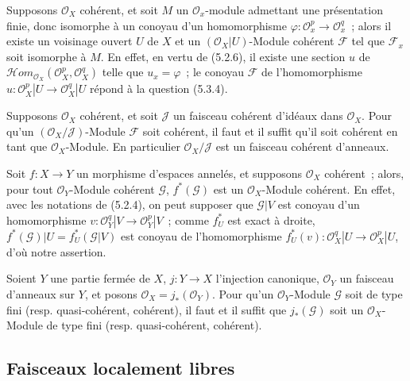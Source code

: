 \begin{env}[5.3.9]
\label{0.5.3.9-fr}
Supposons $\mathcal{O}_X$ cohérent, et soit $M$ un $\mathcal{O}_x$-module
admettant une présentation finie, donc isomorphe à un conoyau d'un
homomorphisme $\varphi:\mathcal{O}_x^p\to\mathcal{O}_x^q$~; alors il existe un
voisinage ouvert $U$ de $X$ et un $(\mathcal{O}_X|U)$-Module cohérent
$\mathcal{F}$ tel que $\mathcal{F}_x$ soit isomorphe à $M$. En effet, en vertu
de (5.2.6), il existe une section $u$ de
$\mathcal{H}\!om_{\mathcal{O}_X}(\mathcal{O}_X^p,\mathcal{O}_X^q)$ telle que $u_x=\varphi$~; le conoyau
$\mathcal{F}$ de l'homomorphisme
$u:\mathcal{O}_X^p|U\to\mathcal{O}_X^q|U$ répond à la question (5.3.4).
\end{env}

\begin{env}[5.3.10]
\label{0.5.3.10-fr}
Supposons $\mathcal{O}_X$ cohérent, et soit $\mathcal{J}$ un faisceau cohérent
d'idéaux dans $\mathcal{O}_X$. Pour qu'un
$(\mathcal{O}_X/\mathcal{J})$-Module $\mathcal{F}$ soit cohérent, il faut et il
suffit qu'il soit cohérent en tant que $\mathcal{O}_X$-Module. En particulier
$\mathcal{O}_X/\mathcal{J}$ est un faisceau cohérent d'anneaux.
\end{env}

\begin{env}[5.3.11]
\label{0.5.3.11-fr}
Soit $f:X\to Y$ un morphisme d'espaces annelés, et supposons
$\mathcal{O}_X$ cohérent~; alors, pour tout $\mathcal{O}_Y$-Module cohérent
$\mathcal{G}$, $f^*(\mathcal{G})$ est un $\mathcal{O}_X$-Module cohérent. En
effet, avec les notations de (5.2.4), on peut supposer que $\mathcal{G}|V$ est
conoyau d'un homomorphisme
$v:\mathcal{O}_Y^q|V\to\mathcal{O}_Y^p|V$~; comme $f_U^*$ est exact à droite,
$f^*(\mathcal{G})|U=f_U^*(\mathcal{G}|V)$ est conoyau de l'homomorphisme
$f_U^*(v):\mathcal{O}_X^q|U\to\mathcal{O}_X^p|U$, d'où notre assertion.
\end{env}

\begin{env}[5.3.12]
\label{0.5.3.12-fr}
Soient $Y$ une partie fermée de $X$, $j:Y\to X$ l'injection canonique,
$\mathcal{O}_Y$ un faisceau d'anneaux sur $Y$, et posons
$\mathcal{O}_X=j_*(\mathcal{O}_Y)$. Pour qu'un $\mathcal{O}_Y$-Module
$\mathcal{G}$ soit de type fini (resp. quasi-cohérent, cohérent), il faut et il
suffit que $j_*(\mathcal{G})$ soit un $\mathcal{O}_X$-Module de type fini
(resp. quasi-cohérent, cohérent).
\end{env}

\subsection{Faisceaux localement libres}
\label{subsection:0.5.4-fr}

